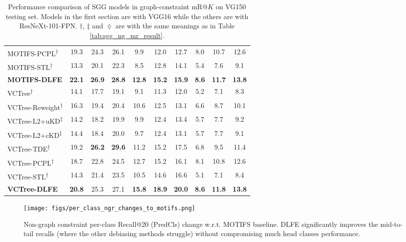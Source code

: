 \documentclass[sigconf]{acmart}
\begin{document}
\begin{table*}[htbp]
{\begin{tabular}{l|c c c|c c c|c c c}
MOTIFS-PCPL\textsuperscript{$\dagger$} \cite{yan2020pcpl} & 19.3 & 24.3 & 26.1 & 9.9 & 12.0 & 12.7 & 8.0 & 10.7 & 12.6 \\
MOTIFS-STL\textsuperscript{$\dagger$} \cite{chen2019soft} & 13.3 & 20.1 & 22.3 & 8.5 & 12.8 & 14.1 & 5.4 & 7.6 & 9.1 \\
\textbf{MOTIFS-DLFE} & \textbf{22.1} & \textbf{26.9} & \textbf{28.8} & \textbf{12.8} & \textbf{15.2} & \textbf{15.9} & \textbf{8.6} & \textbf{11.7} & \textbf{13.8} \\
\hline
VCTree\textsuperscript{$\dagger$} \cite{tang2019learning,tang2020unbiased} & 14.1 & 17.7 & 19.1 & 9.1 & 11.3 & 12.0 & 5.2 & 7.1 & 8.3 \\
VCTree-Reweight\textsuperscript{$\dagger$} & 16.3 & 19.4 & 20.4 & 10.6 & 12.5 & 13.1 & 6.6 & 8.7 & 10.1\\
VCTree-L2+uKD\textsuperscript{$\ddagger$} \cite{DBLP:conf/bmvc/WangPL20} & 14.2 & 18.2 & 19.9 & 9.9 & 12.4 & 13.4 & 5.7 & 7.7 & 9.2 \\ 
VCTree-L2+cKD\textsuperscript{$\ddagger$} \cite{DBLP:conf/bmvc/WangPL20} & 14.4 & 18.4 & 20.0 & 9.7 & 12.4 & 13.1 & 5.7 & 7.7 & 9.1 \\ 
VCTree-TDE\textsuperscript{$\dagger$} \cite{tang2020unbiased} & 19.2 & \textbf{26.2} & \textbf{29.6} & 11.2 & 15.2 & 17.5 & 6.8 & 9.5 & 11.4 \\
VCTree-PCPL\textsuperscript{$\dagger$} \cite{yan2020pcpl} & 18.7 & 22.8 & 24.5 & 12.7 & 15.2 & 16.1 & 8.1 & 10.8 & 12.6 \\
VCTree-STL\textsuperscript{$\dagger$} \cite{chen2019soft} & 14.3 & 21.4 & 23.5  & 10.5 & 14.6 & 16.6 & 5.1 & 7.1 & 8.4 \\
\textbf{VCTree-DLFE} & \textbf{20.8} & 25.3 & 27.1 & \textbf{15.8} & \textbf{18.9} & \textbf{20.0} & \textbf{8.6} & \textbf{11.8} & \textbf{13.8} \\
\hline
\end{tabular}
}
\vspace{0.1em}
\caption{Performance comparison of SGG models in graph-constraint mR@$K$ on VG150 \cite{krishna2017visual,xu2017scene} testing set. 
Models in the first section are with VGG16 while the others are with ResNeXt-101-FPN.
$\dagger$, $\ddagger$ and $\lozenge$ are with the same meanings as in Table \ref{tab:sgg_ng_mr_result}.
}
\label{tab:sgg_mr_result}
\vspace{-1.7em}
\end{table*}

\begin{figure*}[t!]
\begin{center}
\texttt{[image: figs/per\_class\_ngr\_changes\_to\_motifs.png]}
\end{center}
\vspace{-1.2em}
  \caption{Non-graph constraint per-class Recall@20 (PredCls) change w.r.t. MOTIFS baseline.
DLFE significantly improves the mid-to-tail recalls (where the other debiasing methods struggle) without compromising much head classes performance.}
\label{fig:recall_changes_to_smn}
\vspace{-1em}
\end{figure*}
\end{document}
